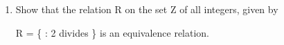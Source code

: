 
\begin{enumerate}

\item Show that the relation R on the set Z of all integers, given by 
    
    
    R = \{ : 2 divides \} is an equivalence relation.
    
 \end{enumerate}

